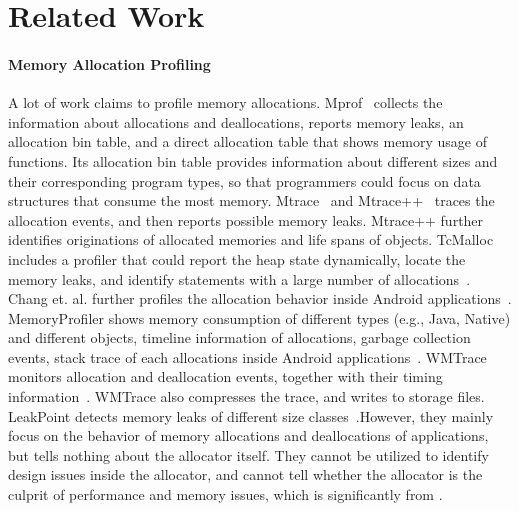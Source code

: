 \section{Related Work}
\label{sec:relatedwork}

\paragraph{Memory Allocation Profiling} A lot of work claims to profile memory allocations. Mprof~\cite{Zorn:1988:MAP:894814} collects the information about allocations and deallocations, reports memory leaks, an allocation bin table, and a direct allocation table that shows memory usage of functions. Its allocation bin table provides information about different sizes and their corresponding program types, so that programmers could focus on data structures that consume the most memory. Mtrace~\cite{mtrace} and Mtrace++~\cite{Lee:2000:DMM:786772.787150} traces the allocation events, and then reports possible memory leaks. Mtrace++ further identifies originations of allocated memories and life spans of objects. TcMalloc includes a profiler that could report the heap state dynamically, locate the memory leaks, and identify statements with a large number of allocations~\cite{tcmalloc}.  Chang et. al. further profiles the allocation behavior inside Android applications~\cite{7031343}. MemoryProfiler shows memory consumption of different types (e.g., Java, Native) and different objects, timeline information of allocations, garbage collection events, stack trace of each allocations inside Android applications~\cite{MemoryProfiler}. WMTrace monitors allocation and deallocation events, together with their timing information~\cite{Perks:2011:WAP:2186355.2186369}. WMTrace also compresses the trace, and writes to storage files. LeakPoint detects memory leaks of different size classes~\cite{Clause:2010:LPC:1806799.1806874}.However, they mainly focus on the behavior of memory allocations and deallocations of applications, but tells nothing about the allocator itself. They cannot be utilized to identify design issues inside the allocator, and cannot tell whether the allocator is the culprit of performance and memory issues, which is significantly from \MP{}. 

